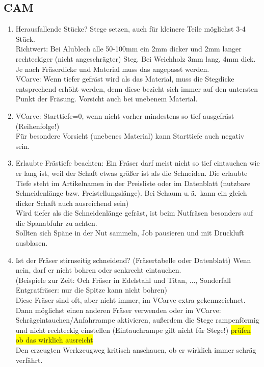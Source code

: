 \documentclass{\basedir/fablab-document}
\renewcommand{\todo}[1]{\colorbox{yellow}{{#1}}}
\begin{document}
\subsection{CAM}
\begin{enumerate}
	\item Herausfallende Stücke? Stege setzen, auch für kleinere Teile möglichst 3-4 Stück.\\Richtwert: Bei Alublech alle 50-100mm ein 2mm dicker und 2mm langer rechteckiger (nicht angeschrägter) Steg. Bei Weichholz 3mm lang, 4mm dick. Je nach Fräserdicke und Material muss das angepasst werden.\\
VCarve: Wenn tiefer gefräst wird als das Material, muss die Stegdicke entsprechend erhöht werden, denn diese bezieht sich immer auf den untersten Punkt der Fräsung. Vorsicht auch bei unebenem Material.
	\item VCarve: Starttiefe=0, wenn nicht vorher mindestens so tief ausgefräst (Reihenfolge!)\\
Für besondere Vorsicht (unebenes Material) kann Starttiefe auch negativ sein.
	\item Erlaubte Frästiefe beachten: Ein Fräser darf meist nicht so tief eintauchen wie er lang ist, weil der Schaft etwas größer ist als die Schneiden. Die erlaubte Tiefe steht im Artikelnamen in der Preisliste oder im Datenblatt (nutzbare Schneidenlänge bzw. Freistellungslänge).
Bei Schaum u.\,ä.\  kann ein gleich dicker Schaft auch ausreichend sein) \\
Wird tiefer als die Schneidenlänge gefräst, ist beim Nutfräsen besonders auf die Spanabfuhr zu achten. \\
Sollten sich Späne in der Nut sammeln, Job pausieren und mit Druckluft ausblasen.
	\item Ist der Fräser stirnseitig schneidend? (Fräsertabelle oder Datenblatt) Wenn nein, darf er nicht bohren oder senkrecht eintauchen.\\
(Beispiele zur Zeit: Och Fräser in Edelstahl und Titan, ..., Sonderfall Entgratfräser: nur die Spitze kann nicht bohren)\\
Diese Fräser sind oft, aber nicht immer, im VCarve extra gekennzeichnet.\\
Dann möglichst einen anderen Fräser verwenden oder im VCarve: Schrägeintauchen/Anfahrrampe aktivieren, außerdem die Stege rampenförmig und nicht rechteckig einstellen (Eintauchrampe gilt nicht für Stege!)  \todo{prüfen ob das wirklich ausreicht}\\
Den erzeugten Werkzeugweg kritisch anschauen, ob er wirklich immer schräg verfährt.

\end{enumerate}
\end{document}
